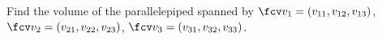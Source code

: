 \begin{frame}
\begin{example}
Find the volume of the parallelepiped spanned by $\fcv v_1=(v_{11},v_{12},v_{13})$, $\fcv v_2=(v_{21}, v_{22}, v_{23})$, $\fcv v_3=(v_{31}, v_{32}, v_{33})$.
\end{example}
\end{frame}